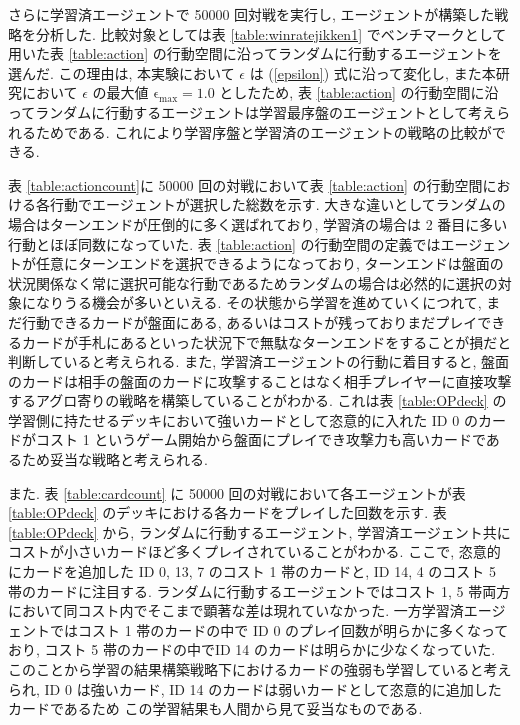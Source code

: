 \documentclass[12pt]{jarticle}
\begin{document}
  さらに学習済エージェントで 50000 回対戦を実行し, エージェントが構築した戦略を分析した. 比較対象としては表 \ref{table:winratejikken1} でベンチマークとして用いた表 \ref{table:action} の行動空間に沿ってランダムに行動するエージェントを選んだ. この理由は, 本実験において $\epsilon$ は (\ref{epsilon}) 式に沿って変化し, また本研究において $\epsilon$ の最大値 $\mathrm{\epsilon_{max}} = 1.0$ としたため, 表 \ref{table:action} の行動空間に沿ってランダムに行動するエージェントは学習最序盤のエージェントとして考えられるためである. これにより学習序盤と学習済のエージェントの戦略の比較ができる.\par
  表 \ref{table:actioncount}に 50000 回の対戦において表 \ref{table:action} の行動空間における各行動でエージェントが選択した総数を示す. 大きな違いとしてランダムの場合はターンエンドが圧倒的に多く選ばれており, 学習済の場合は 2 番目に多い行動とほぼ同数になっていた. 表 \ref{table:action} の行動空間の定義ではエージェントが任意にターンエンドを選択できるようになっており, ターンエンドは盤面の状況関係なく常に選択可能な行動であるためランダムの場合は必然的に選択の対象になりうる機会が多いといえる. その状態から学習を進めていくにつれて, まだ行動できるカードが盤面にある, あるいはコストが残っておりまだプレイできるカードが手札にあるといった状況下で無駄なターンエンドをすることが損だと判断していると考えられる. 
  また, 学習済エージェントの行動に着目すると, 盤面のカードは相手の盤面のカードに攻撃することはなく相手プレイヤーに直接攻撃するアグロ寄りの戦略を構築していることがわかる. これは表 \ref{table:OPdeck} の学習側に持たせるデッキにおいて強いカードとして恣意的に入れた ID 0 のカードがコスト 1 というゲーム開始から盤面にプレイでき攻撃力も高いカードであるため妥当な戦略と考えられる. \par
  また. 表 \ref{table:cardcount} に 50000 回の対戦において各エージェントが表 \ref{table:OPdeck} のデッキにおける各カードをプレイした回数を示す. 表 \ref{table:OPdeck} から, ランダムに行動するエージェント, 学習済エージェント共にコストが小さいカードほど多くプレイされていることがわかる. ここで, 恣意的にカードを追加した ID 0, 13, 7 のコスト 1 帯のカードと, ID 14, 4 のコスト 5 帯のカードに注目する. ランダムに行動するエージェントではコスト 1, 5 帯両方において同コスト内でそこまで顕著な差は現れていなかった. 一方学習済エージェントではコスト 1 帯のカードの中で ID 0 のプレイ回数が明らかに多くなっており, コスト 5 帯のカードの中でID 14 のカードは明らかに少なくなっていた. このことから学習の結果構築戦略下におけるカードの強弱も学習していると考えられ,
  ID 0 は強いカード, ID 14 のカードは弱いカードとして恣意的に追加したカードであるため この学習結果も人間から見て妥当なものである. \par
\end{document}
